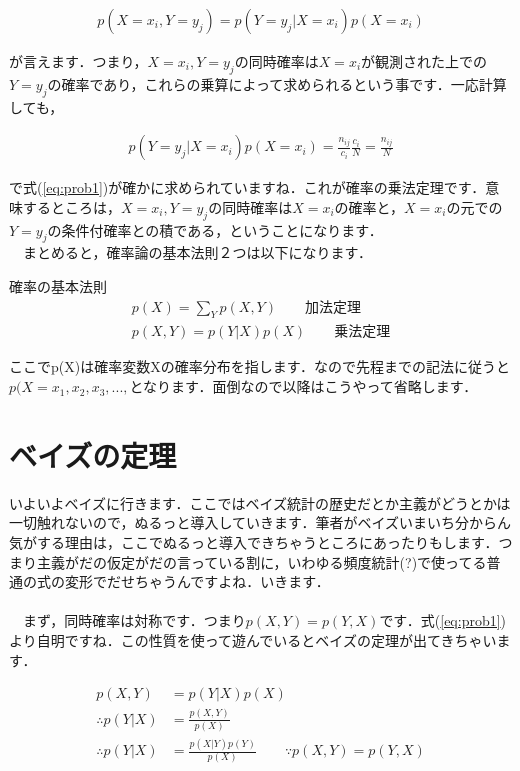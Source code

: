 \documentclass[11pt,a4paper,uplatex]{ujreport} 	%
\begin{document}
\begin{align}
p(X=x_i , Y=y_j) = p(Y=y_j | X=x_i)p(X=x_i)
\label{eq:product}
\end{align}

が言えます．つまり，$X=x_i , Y=y_j$の同時確率は$X=x_i$が観測された上での$Y=y_j$の確率であり，これらの乗算によって求められるという事です．一応計算しても，

\begin{align}
p(Y=y_j | X=x_i)p(X=x_i) = \frac{n_{ij}}{c_i}\frac{c_i}{N} = \frac{n_{ij}}{N}
\label{eq:product}
\end{align}

で式(\ref{eq:prob1})が確かに求められていますね．これが確率の乗法定理です．意味するところは，$X=x_i, Y=y_j$の同時確率は$X=x_i$の確率と，$X=x_i$の元での$Y=y_j$の条件付確率との積である，ということになります．
\\
　まとめると，確率論の基本法則２つは以下になります．

\begin{screen}
確率の基本法則
\begin{align}
p(X) = \sum_Y p(X,Y) \qquad \text{加法定理} \nonumber \\
p(X,Y) = p(Y|X)p(X) \qquad \text{乗法定理} \nonumber
\end{align}
\end{screen}

ここでp(X)は確率変数Xの確率分布を指します．なので先程までの記法に従うと$p(X=x_1, x_2, x_3, ..., $となります．面倒なので以降はこうやって省略します．

\section{ベイズの定理}
いよいよベイズに行きます．ここではベイズ統計の歴史だとか主義がどうとかは一切触れないので，ぬるっと導入していきます．筆者がベイズいまいち分からん気がする理由は，ここでぬるっと導入できちゃうところにあったりもします．つまり主義がだの仮定がだの言っている割に，いわゆる頻度統計(?)で使ってる普通の式の変形でだせちゃうんですよね．いきます．\\
\\
　まず，同時確率は対称です．つまり$p(X,Y) = p(Y,X)$です．式(\ref{eq:prob1})より自明ですね．この性質を使って遊んでいるとベイズの定理が出てきちゃいます．

\begin{align}
\label{eq:bayes}
p(X, Y) &= p(Y|X)p(X)　\\
\therefore p(Y|X) &= \frac{p(X,Y)}{p(X)}  \\
\therefore p(Y|X) &= \frac{p(X|Y)p(Y)}{p(X)} \qquad \because p(X,Y) = p(Y, X)
\end{align}
\end{document}
